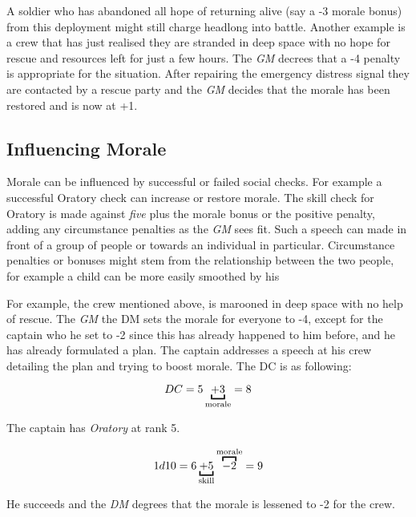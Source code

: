 A soldier who has abandoned all hope of returning alive (say a -3 morale
bonus) from this deployment might still charge headlong into battle. Another
example is a crew that has just realised they are stranded in deep space
with no hope for rescue and resources left for just a few hours. The
\emph{GM} decrees that a -4 penalty is appropriate for the situation. After
repairing the emergency distress signal they are contacted by a rescue party
and the \emph{GM} decides that the morale has been restored and is now at +1.

\subsection{Influencing Morale}

Morale can be influenced by successful or failed social checks. For example
a successful Oratory check can increase or restore morale. The skill check for
Oratory is made against \emph{five} plus the morale bonus or the positive
penalty, adding any circumstance penalties as the \emph{GM} sees fit. Such a
speech can made in front of a group of people or towards an individual in
particular. Circumstance penalties or bonuses might stem from the relationship
between the two people, for example a child can be more easily smoothed by his

For example, the crew mentioned above, is marooned in deep space with no help
of rescue. The \emph{GM} the DM sets the morale for everyone to -4, except for
the captain who he set to -2 since this has already happened to him before,
and he has already formulated a plan. The captain addresses a speech at his
crew detailing the plan and trying to boost morale. The DC is as following:

\[
DC = 5 \ub{+ 3}{morale} = 8
\]

The captain has \emph{Oratory} at rank 5.

\[
1d10 = 6 \ub{+ 5}{skill} \ob{- 2}{morale} = 9
\]

He succeeds and the \emph{DM} degrees that the morale is lessened to -2 for
the crew.
